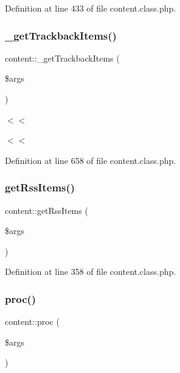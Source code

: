 Definition at line 433 of file content.\+class.\+php.

\mbox{\label{classcontent_a4cdf2e0d2ede8a8bca1c61526f920adc}} 
\subsubsection{\texorpdfstring{\+\_\+get\+Trackback\+Items()}{\_getTrackbackItems()}}
{\footnotesize\ttfamily content\+::\+\_\+get\+Trackback\+Items (\begin{DoxyParamCaption}\item[{}]{\$args }\end{DoxyParamCaption})}

$<$$<$

$<$$<$ 

Definition at line 658 of file content.\+class.\+php.

\mbox{\label{classcontent_a78e600f4e35fe539b4ae34218d702e04}} 
\subsubsection{\texorpdfstring{get\+Rss\+Items()}{getRssItems()}}
{\footnotesize\ttfamily content\+::get\+Rss\+Items (\begin{DoxyParamCaption}\item[{}]{\$args }\end{DoxyParamCaption})}



Definition at line 358 of file content.\+class.\+php.

\mbox{\label{classcontent_aacac5eb20ef4b64552d77bd5d2e2bf99}} 
\subsubsection{\texorpdfstring{proc()}{proc()}}
{\footnotesize\ttfamily content\+::proc (\begin{DoxyParamCaption}\item[{}]{\$args }\end{DoxyParamCaption})}




